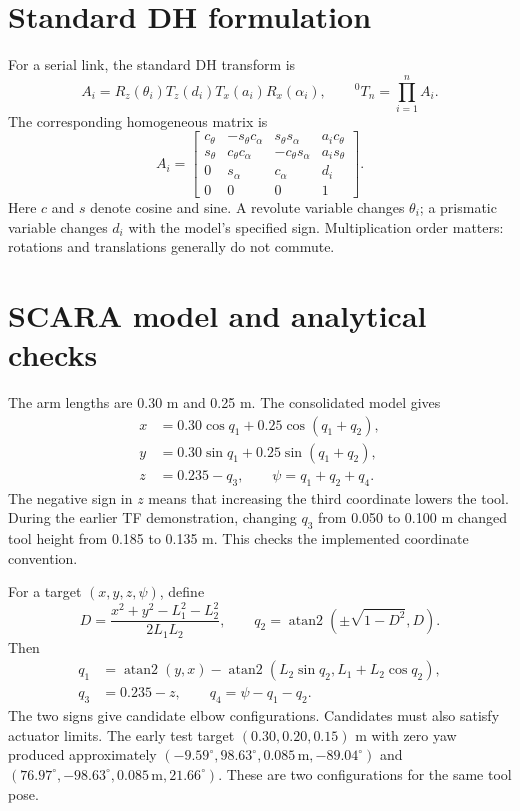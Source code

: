\documentclass[11pt,a4paper,oneside]{report}
\begin{document}
\section{Standard DH formulation}
For a serial link, the standard DH transform is
\begin{equation}
A_i=R_z(\theta_i)T_z(d_i)T_x(a_i)R_x(\alpha_i),\qquad {}^0T_n=\prod_{i=1}^{n}A_i.
\end{equation}
The corresponding homogeneous matrix is
\begin{equation}
A_i=\begin{bmatrix}
 c_\theta&-s_\theta c_\alpha&s_\theta s_\alpha&a_i c_\theta\\
 s_\theta&c_\theta c_\alpha&-c_\theta s_\alpha&a_i s_\theta\\
 0&s_\alpha&c_\alpha&d_i\\0&0&0&1
\end{bmatrix}.
\end{equation}
Here $c$ and $s$ denote cosine and sine. A revolute variable changes $\theta_i$; a prismatic variable changes $d_i$ with the model's specified sign. Multiplication order matters: rotations and translations generally do not commute.

\section{SCARA model and analytical checks}
The arm lengths are 0.30 m and 0.25 m. The consolidated model gives
\begin{align}
x&=0.30\cos q_1+0.25\cos(q_1+q_2),\\
y&=0.30\sin q_1+0.25\sin(q_1+q_2),\\
z&=0.235-q_3,\qquad \psi=q_1+q_2+q_4.
\end{align}
The negative sign in $z$ means that increasing the third coordinate lowers the tool. During the earlier TF demonstration, changing $q_3$ from 0.050 to 0.100 m changed tool height from 0.185 to 0.135 m. This checks the implemented coordinate convention.

For a target $(x,y,z,\psi)$, define
\begin{equation}
D=\frac{x^2+y^2-L_1^2-L_2^2}{2L_1L_2},\qquad q_2=\operatorname{atan2}(\pm\sqrt{1-D^2},D).
\end{equation}
Then
\begin{align}
q_1&=\operatorname{atan2}(y,x)-\operatorname{atan2}(L_2\sin q_2,L_1+L_2\cos q_2),\\
q_3&=0.235-z,\qquad q_4=\psi-q_1-q_2.
\end{align}
The two signs give candidate elbow configurations. Candidates must also satisfy actuator limits. The early test target $(0.30,0.20,0.15)$ m with zero yaw produced approximately $(-9.59^\circ,98.63^\circ,0.085\,\mathrm m,-89.04^\circ)$ and $(76.97^\circ,-98.63^\circ,0.085\,\mathrm m,21.66^\circ)$. These are two configurations for the same tool pose.
\end{document}
